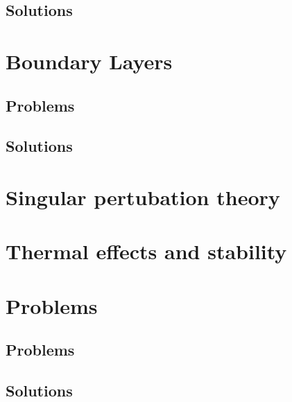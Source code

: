       \section{Solutions}
         \shipoutAnswer

   \chapter{Boundary Layers}
      
      
      
      
      \section{Problems}
         
      \section{Solutions}
         \shipoutAnswer

   \chapter{Singular pertubation theory}
      
      

   \chapter{Thermal effects and stability}
      
      

   

   \chapter{Problems}
      \section{Problems}
         
         
         
         
         
         
         
         
         
         
         
      \section{Solutions}
         \shipoutAnswer


